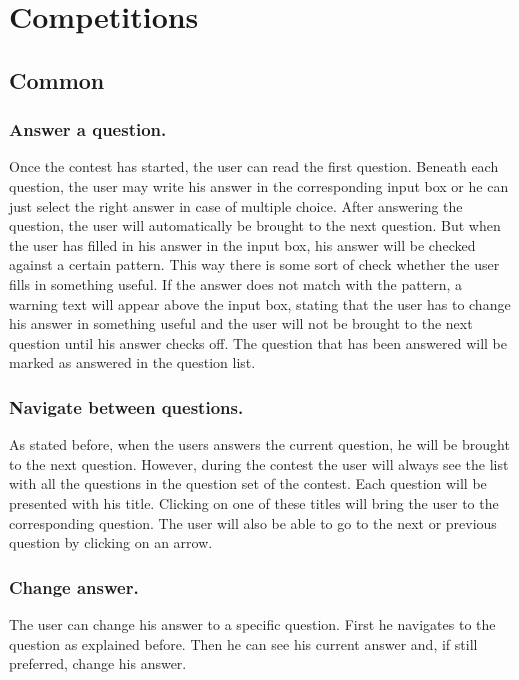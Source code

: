 \section{Competitions}

\subsection{Common}

\subsubsection{Answer a question.} 
Once the contest has started, the user can read the first question. Beneath each question, the user may write his answer in the corresponding input box or he can just select the right answer in case of multiple choice. After answering the question, the user will automatically be brought to the next question. But when the user has filled in his answer in the input box, his answer will be checked against a certain pattern. This way there is some sort of check whether the user fills in something useful. If the answer does not match with the pattern, a warning text will appear above the input box, stating that the user has to change his answer in something useful and the user will not be brought to the next question until his answer checks off. The question that has been answered will be marked as answered in the question list.

\subsubsection{Navigate between questions.} 
As stated before, when the users answers the current question, he will be brought to the next question. However, during the contest the user will always see the list with all the questions in the question set of the contest. Each question will be presented with his title. Clicking on one of these titles will bring the user to the corresponding question. The user will also be able to go to the next or previous question by clicking on an arrow. 

\subsubsection{Change answer.} 
The user can change his answer to a specific question. First he navigates to the question as explained before. Then he can see his current answer and, if still preferred, change his answer. 

